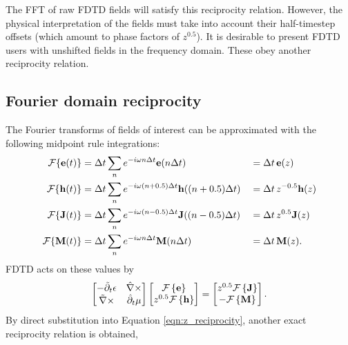 %
The FFT of raw FDTD fields will satisfy this reciprocity relation.  However, the physical interpretation of the fields must take into account their half-timestep offsets (which amount to phase factors of $z^{0.5}$).  It is desirable to present FDTD users with unshifted fields in the frequency domain.  These obey another reciprocity relation.

\subsection{Fourier domain reciprocity}

The Fourier transforms of fields of interest can be approximated with the following midpoint rule integrations:
%
\begin{equation}
	\begin{aligned}
		\mathcal{F}\{ \textbf{e}(t) \} &= \Delta t \sum_n e^{-i \omega n \Delta t} \textbf{e}(n \Delta t) &&= \Delta t \, \textbf{e}(z)\\
		\mathcal{F}\{ \textbf{h}(t) \} &= \Delta t \sum_n e^{-i \omega (n+0.5) \Delta t} \textbf{h}( (n+0.5) \Delta t) &&= \Delta t \, z^{-0.5} \textbf{h}(z) \\
		\mathcal{F}\{ \textbf{J}(t) \} &= \Delta t \sum_n e^{-i \omega (n-0.5) \Delta t} \textbf{J}( (n-0.5) \Delta t) &&= \Delta t \, z^{0.5} \textbf{J}(z) \\
		\mathcal{F}\{ \textbf{M}(t) \} &= \Delta t \sum_n e^{-i \omega n \Delta t} \textbf{M}( n \Delta t) &&= \Delta t \, \textbf{M}(z).
	\end{aligned}
\end{equation}
%
FDTD acts on these values by
%
\begin{equation}
	\begin{bmatrix}
	-\tilde{\partial}_t \epsilon & \hat{\nabla}\times \\
	\tilde{\nabla}\times & \hat{\partial}_t \mu
	\end{bmatrix}
	\begin{bmatrix} \mathcal{F} \left\{ \textbf{e} \right\} \\ z^{0.5} \mathcal{F} \left\{ \textbf{h} \right\} \end{bmatrix}
	=
	\begin{bmatrix} z^{0.5} \mathcal{F} \left\{ \textbf{J} \right\} \\ - \mathcal{F} \left\{ \textbf{M} \right\} \end{bmatrix}.
\end{equation}
%
By direct substitution into Equation \ref{eqn:z_reciprocity}, another exact reciprocity relation is obtained,
%

